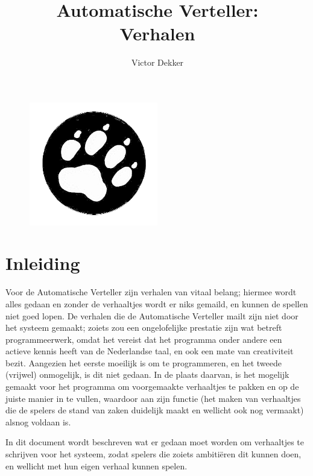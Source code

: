 \documentclass[12pt]{article}
\author{Victor Dekker}
\title{Automatische Verteller:\\Verhalen}
\begin{document}
\titlespacing{\subsubsection}{0in}{0.2in}{0in}

\maketitle

\begin{figure}[h!]
  \centering
  \includegraphics[width=0.5\textwidth]{Welp2.png}
\end{figure}

\newpage
\tableofcontents
\newpage

\section{Inleiding}

  Voor de Automatische Verteller zijn verhalen van vitaal belang; hiermee wordt alles gedaan en zonder de verhaaltjes wordt er niks gemaild, en kunnen de spellen niet goed lopen. De verhalen die de Automatische Verteller mailt zijn niet door het systeem gemaakt; zoiets zou een ongelofelijke prestatie zijn wat betreft programmeerwerk, omdat het vereist dat het programma onder andere een actieve kennis heeft van de Nederlandse taal, en ook een mate van creativiteit bezit. Aangezien het eerste moeilijk is om te programmeren, en het tweede (vrijwel) onmogelijk, is dit niet gedaan. In de plaats daarvan, is het mogelijk gemaakt voor het programma om voorgemaakte verhaaltjes te pakken en op de juiste manier in te vullen, waardoor aan zijn functie (het maken van verhaaltjes die de spelers de stand van zaken duidelijk maakt en wellicht ook nog vermaakt) alsnog voldaan is.
  
  In dit document wordt beschreven wat er gedaan moet worden om verhaaltjes te schrijven voor het systeem, zodat spelers die zoiets ambiti\"eren dit kunnen doen, en wellicht met hun eigen verhaal kunnen spelen.
  
\end{document}
